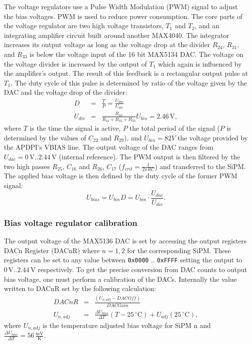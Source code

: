 \documentclass[]{article}
\begin{document}
The voltage regulators use a Pulse Width Modulation (PWM) signal to adjust the bias voltages. PWM is used to reduce power consumption.
The core parts of the voltage regulator are two high voltage transistors, $T_1$ and $T_2$, and an integrating amplifier circuit built around another MAX4040. The integrator increases
its output voltage as long as the voltage drop at the divider $R_{24}$, $R_{31}$, and $R_{33}$ is below the voltage input of the 16 bit MAX5134 DAC.
The voltage on the voltage divider is increased by the output of $T_1$ which again is influenced by the amplifier's output. The result of this feedback is a rectangular output
pulse at $T_1$. The duty cycle of this pulse is determined by ratio of the voltage given by the DAC and the voltage drop of the divider:
	\begin{eqnarray}
		D &=& \frac{T}{P} = \frac{U_{dac}}{U_{div}} \\
		U_{div} &=& \frac{R_{33}}{R_{24} + R_{31} + R_{33}} U_{bin} = 2.46\,\text{V},
	\end{eqnarray}
where $T$ is the time the signal is active, $P$ the total period of the signal ($P$ is determined by the values of $C_{22}$ and $R_{29}$), and $U_{bin}=82V$ the voltage provided by the 
APDPI's VBIAS line. The output voltage of the DAC ranges from $U_{dac}=0\, \text{V} .. 2.44\, \text{V}$ (internal reference). The PWM output is then filtered by the two high passes 
$R_{25}$, $C_{16}$ and $R_{26}$, $C_{17}$ ($f_{crit} = \frac{1}{2 \pi RC}$) and transferred to the SiPM. The applied bias voltage is then defined by the duty cycle of the former 
PWM signal:
	\begin{equation}
		U_{bias} = U_{bin} D = U_{bin} \cdot \frac{U_{dac}}{U_{div}}.
	\end{equation}

\subsubsection*{Bias voltage regulator calibration}
The output voltage of the MAX5136 DAC is set by accessing the output registers DACn Register (DACnR) where $n=1,2$ for the corresponding SiPM. These registers can be set to any value between \verb|0x0000| .. \verb|0xFFFF| setting the output to $0\, \text{V}..2.44\, \text{V}$ respectively. To get the precise conversion from DAC counts to output bias voltage, one must perform a calibration of the DACs. Internally the value written to DACnR set by the following calculation:
	\begin{eqnarray}
		DACnR &=&  \frac{(U_{n,adj} - DACOff)}{DACGain} \\
		U_{n,adj} &=& \frac{\Delta U_{bias}}{\Delta T}(T - 25\,^{\circ} \text{C}) + U_{adj}(25\,^{\circ} \text{C}),
	\end{eqnarray} 
where $U_{n,adj}$ is the temperature adjusted bias voltage for SiPM n and $\frac{\Delta U_{bias}}{\Delta T} = 56\,\frac{\text{mV}}{\text{K}}$. 
\end{document}
